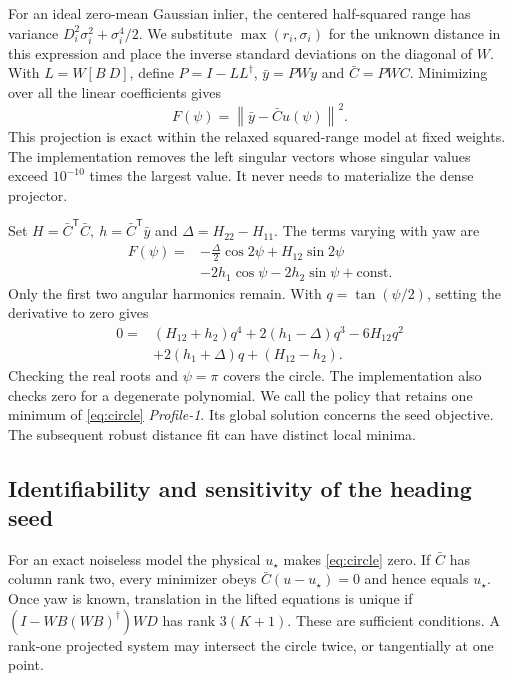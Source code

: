 \documentclass{IEEEtaes}
\newcommand{\norm}[1]{\left\lVert#1\right\rVert}
\newcommand{\trans}{^{\mathsf T}}
\begin{document}
For an ideal zero-mean Gaussian inlier, the centered half-squared range has variance \(D_i^2\sigma_i^2+\sigma_i^4/2\). We substitute \(\max(r_i,\sigma_i)\) for the unknown distance in this expression and place the inverse standard deviations on the diagonal of \(W\). With \(L=W[B\ D]\), define \(P=I-LL^\dagger\), \(\bar y=PWy\) and \(\bar C=PWC\). Minimizing over all the linear coefficients gives
\begin{equation}
 F(\psi)=\norm{\bar y-\bar C u(\psi)}^2. \label{eq:circle}
\end{equation}
This projection is exact within the relaxed squared-range model at fixed weights. The implementation removes the left singular vectors whose singular values exceed \(10^{-10}\) times the largest value. It never needs to materialize the dense projector.

Set \(H=\bar C\trans\bar C,\ h=\bar C\trans\bar y\) and \(\Delta=H_{22}-H_{11}\). The terms varying with yaw are
\begin{align}
 F(\psi)={}&-\tfrac{\Delta}{2}\cos2\psi+H_{12}\sin2\psi \nonumber\\
           &-2h_1\cos\psi-2h_2\sin\psi+\mathrm{const}. \label{eq:harmonic}
\end{align}
Only the first two angular harmonics remain. With \(q=\tan(\psi/2)\), setting the derivative to zero gives
\begin{align}
 0={}&(H_{12}+h_2)q^4+2(h_1-\Delta)q^3-6H_{12}q^2 \nonumber\\
     &+2(h_1+\Delta)q+(H_{12}-h_2). \label{eq:quartic}
\end{align}
Checking the real roots and \(\psi=\pi\) covers the circle. The implementation also checks zero for a degenerate polynomial. We call the policy that retains one minimum of \eqref{eq:circle} \emph{Profile-1}. Its global solution concerns the seed objective. The subsequent robust distance fit can have distinct local minima.

\subsection{Identifiability and sensitivity of the heading seed}
For an exact noiseless model the physical \(u_\star\) makes \eqref{eq:circle} zero. If \(\bar C\) has column rank two, every minimizer obeys \(\bar C(u-u_\star)=0\) and hence equals \(u_\star\). Once yaw is known, translation in the lifted equations is unique if \((I-WB(WB)^\dagger)WD\) has rank \(3(K+1)\). These are sufficient conditions. A rank-one projected system may intersect the circle twice, or tangentially at one point.
\end{document}

